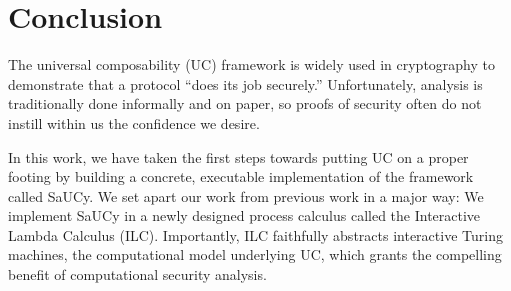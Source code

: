 \section{Conclusion}
\label{sec:conclusion}

The universal composability (UC) framework is widely used in cryptography to
demonstrate that a protocol ``does its job securely.'' Unfortunately, analysis
is traditionally done informally and on paper, so proofs of security often do
not instill within us the confidence we desire.

In this work, we have taken the first steps towards putting UC on a proper
footing by building a concrete, executable implementation of the framework
called SaUCy. We set apart our work from previous work in a major way: We
implement SaUCy in a newly designed process calculus called the Interactive
Lambda Calculus (ILC). Importantly, ILC faithfully abstracts interactive Turing
machines, the computational model underlying UC, which grants the compelling
benefit of computational security analysis.
